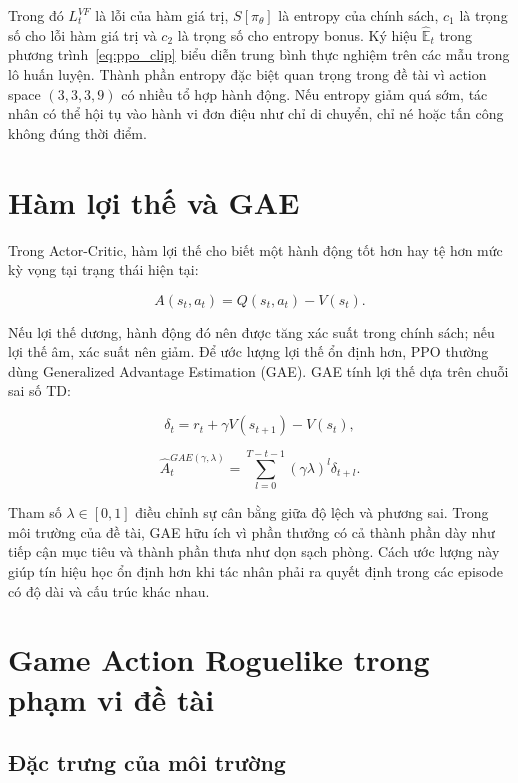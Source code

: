 Trong đó $L_t^{VF}$ là lỗi của hàm giá trị, $S[\pi_\theta]$ là entropy của chính sách, $c_1$ là trọng số cho lỗi hàm giá trị và $c_2$ là trọng số cho entropy bonus. Ký hiệu $\hat{\mathbb{E}}_t$ trong phương trình~\ref{eq:ppo_clip} biểu diễn trung bình thực nghiệm trên các mẫu trong lô huấn luyện. Thành phần entropy đặc biệt quan trọng trong đề tài vì action space $(3,3,3,9)$ có nhiều tổ hợp hành động. Nếu entropy giảm quá sớm, tác nhân có thể hội tụ vào hành vi đơn điệu như chỉ di chuyển, chỉ né hoặc tấn công không đúng thời điểm.

\section{Hàm lợi thế và GAE}

Trong Actor-Critic, hàm lợi thế cho biết một hành động tốt hơn hay tệ hơn mức kỳ vọng tại trạng thái hiện tại:

\begin{equation}
    A(s_t,a_t) = Q(s_t,a_t) - V(s_t).
\end{equation}

Nếu lợi thế dương, hành động đó nên được tăng xác suất trong chính sách; nếu lợi thế âm, xác suất nên giảm. Để ước lượng lợi thế ổn định hơn, PPO thường dùng Generalized Advantage Estimation (GAE). GAE tính lợi thế dựa trên chuỗi sai số TD:

\begin{equation}
    \delta_t = r_t + \gamma V(s_{t+1}) - V(s_t),
\end{equation}

\begin{equation} \label{eq:gae_formula}
    \hat{A}_t^{GAE(\gamma,\lambda)}
    =
    \sum_{l=0}^{T-t-1}(\gamma\lambda)^l \delta_{t+l}.
\end{equation}

Tham số $\lambda \in [0,1]$ điều chỉnh sự cân bằng giữa độ lệch và phương sai. Trong môi trường của đề tài, GAE hữu ích vì phần thưởng có cả thành phần dày như tiếp cận mục tiêu và thành phần thưa như dọn sạch phòng. Cách ước lượng này giúp tín hiệu học ổn định hơn khi tác nhân phải ra quyết định trong các episode có độ dài và cấu trúc khác nhau.

\section{Game Action Roguelike trong phạm vi đề tài}
\subsection{Đặc trưng của môi trường}

